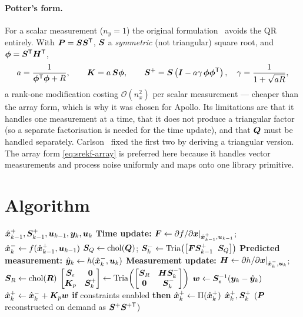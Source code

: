 \paragraph{Potter's form.} For a scalar measurement ($n_y=1$) the original
formulation~\cite{potter1963} avoids the QR entirely. With $\bm{P} = \bm{S}\bm{S}^{\mathsf{T}}$, $\bm{S}$ a
\emph{symmetric} (not triangular) square root, and $\bm\phi = \bm{S}^{\mathsf{T}}\bm{H}^{\mathsf{T}}$,
\begin{equation}
a = \frac{1}{\bm\phi^{\mathsf{T}}\bm\phi + R}, \qquad
\bm{K} = a\,\bm{S}\bm\phi, \qquad
\bm{S}^+ = \bm{S}\left(\bm{I} - a\gamma\,\bm\phi\bm\phi^{\mathsf{T}}\right), \quad
\gamma = \frac{1}{1+\sqrt{aR}},
\label{eq:srekf-potter}
\end{equation}
a rank-one modification costing $\mathcal{O}(n_x^2)$ per scalar measurement --- cheaper than
the array form, which is why it was chosen for Apollo. Its limitations are that it handles
one measurement at a time, that it does not produce a triangular factor (so a separate
factorisation is needed for the time update), and that $\bm{Q}$ must be handled separately.
Carlson~\cite{carlson1973} fixed the first two by deriving a triangular version. The array
form \eqref{eq:srekf-array} is preferred here because it handles vector measurements and
process noise uniformly and maps onto one library primitive.

\section{Algorithm}
\begin{algorithm}[H]
\caption{SR-EKF --- one sampling period}
\begin{algorithmic}[1]
\Require $\hat{\bm{x}}^{+}_{k-1},\bm{S}^+_{k-1},\bm{u}_{k-1},\bm{y}_k,\bm{u}_k$
\State \textbf{Time update:} $\bm{F}\gets\partial f/\partial\bm{x}|_{\hat{\bm{x}}^{+}_{k-1},\bm{u}_{k-1}}$;\;
       $\hat{\bm{x}}^{-}_k\gets f(\hat{\bm{x}}^{+}_{k-1},\bm{u}_{k-1})$
\State $\bm{S}_Q\gets\operatorname{chol}(\bm{Q})$;\;
       $\bm{S}^-_k\gets\operatorname{Tria}\!\left(\left[\bm{F}\bm{S}^+_{k-1}\;\;\bm{S}_Q\right]\right)$
\State \textbf{Predicted measurement:} $\hat{\bm{y}}_k\gets h(\hat{\bm{x}}^{-}_k,\bm{u}_k)$
\State \textbf{Measurement update:} $\bm{H}\gets\partial h/\partial\bm{x}|_{\hat{\bm{x}}^{-}_k,\bm{u}_k}$;\;
       $\bm{S}_R\gets\operatorname{chol}(\bm{R})$
\State $\begin{bmatrix}\bm{S}_e&\bm0\\ \bm{K}_p&\bm{S}^+_k\end{bmatrix}
        \gets \operatorname{Tria}\!\left(\begin{bmatrix}\bm{S}_R&\bm{H}\bm{S}^-_k\\ \bm0&\bm{S}^-_k\end{bmatrix}\right)$
\State $\bm w\gets\bm{S}_e^{-1}(\bm{y}_k-\hat{\bm{y}}_k)$ 
\State $\hat{\bm{x}}^{+}_k\gets\hat{\bm{x}}^{-}_k+\bm{K}_p\bm w$
\State \textbf{if} constraints enabled \textbf{then} $\hat{\bm{x}}^{+}_k\gets\Pi(\hat{\bm{x}}^{+}_k)$
\Ensure $\hat{\bm{x}}^{+}_k,\bm{S}^+_k$ \quad ($\bm{P}$ reconstructed on demand as $\bm{S}^+\bm{S}^{+\mathsf{T}}$)
\end{algorithmic}
\end{algorithm}

